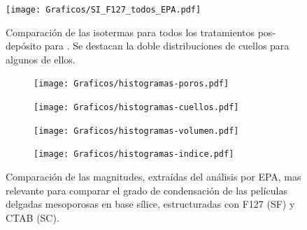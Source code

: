 			\begin{figure}[th!]
		 	   	   \begin{center}
		 	   	   \texttt{[image: Graficos/SI\_F127\_todos\_EPA.pdf]}
			   	   \caption[Comparación PEA tratamientos alternativos (F127)]{Comparación de las isotermas para todos los tratamientos pos-depósito para \pdmF\space. Se destacan la doble distribuciones de cuellos para algunos de ellos.}
				   \label{fig:todos_EPA_F127}	
				   \end{center}
				   \end{figure}	

				   \begin{figure}[ht!]
				 	   	    
				 	   	    \begin{subfigure}[t]{0.5\textwidth}
				        	\texttt{[image: Graficos/histogramas-poros.pdf]}
				       		\end{subfigure}
				         	\begin{subfigure}[t]{0.5\textwidth}
				        	\texttt{[image: Graficos/histogramas-cuellos.pdf]}
				       		\end{subfigure}
				         	 \begin{subfigure}[t]{0.5\textwidth}
				        	\texttt{[image: Graficos/histogramas-volumen.pdf]}
				       		\end{subfigure}
				         	\begin{subfigure}[t]{0.5\textwidth}
				        	\texttt{[image: Graficos/histogramas-indice.pdf]}
				       		\end{subfigure}
				     		\caption[a]{Comparación de las magnitudes, extraídas del análisis por EPA, mas relevante para comparar el grado de condensación de las películas delgadas mesoporosas en base sílice, estructuradas con F127 (SF) y CTAB (SC).}
				     		\label{fig:histogramas}
				     		\end{figure}
		
		\clearpage

